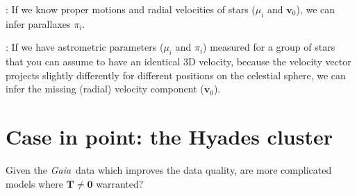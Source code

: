 \documentclass[modern,manuscript]{aastex61}
\newcommand{\project}[1]{\textsl{#1}}
\newcommand{\gaia}{\project{Gaia}}
\newcommand{\bs}[1]{\boldsymbol{#1}}
\newcommand{\mat}[1]{\mathbf{#1}}
\renewcommand{\vec}[1]{\bs{#1}}
\begin{document}
: If we know proper motions and radial velocities of stars
($\mu_i$ and $\vec{v}_0$), we can infer parallaxes $\pi_i$.

:
If we have astrometric parameters ($\mu_i$ and $\pi_i$) measured for a group of
stars that you can assume to have an identical 3D velocity, because the
velocity vector projects slightly differently for different positions on the
celestial sphere, we can infer the missing (radial) velocity component ($\vec{v}_0$).


\section{Case in point: the Hyades cluster}

Given the \gaia\ data which improves the data quality,
are more complicated models where $\mat{T}\neq\mat{0}$ warranted?




% 
\end{document}
